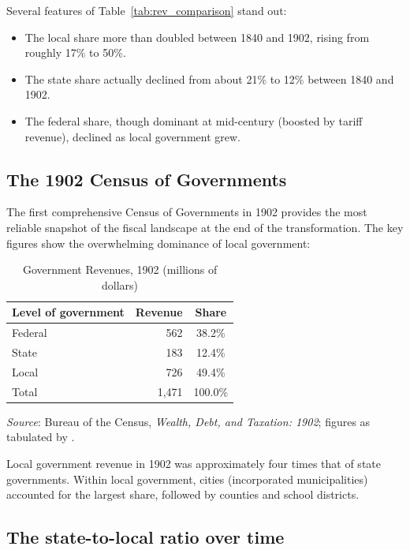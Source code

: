 \documentclass[12pt]{article}
\begin{document}
\noindent Several features of Table~\ref{tab:rev_comparison} stand out:
\begin{itemize}
    \item The local share more than doubled between 1840 and 1902, rising from roughly 17\% to 50\%.
    \item The state share actually declined from about 21\% to 12\% between 1840 and 1902.
    \item The federal share, though dominant at mid-century (boosted by tariff revenue), declined as local government grew.
\end{itemize}

\subsection{The 1902 Census of Governments}

The first comprehensive Census of Governments in 1902 provides the most reliable snapshot of the fiscal landscape at the end of the transformation.  The key figures show the overwhelming dominance of local government:

\begin{table}[htbp]
\centering
\caption{Government Revenues, 1902 (millions of dollars)}
\label{tab:1902}
\begin{tabular}{@{}lrc@{}}
\toprule
Level of government & Revenue & Share \\
\midrule
Federal & 562 & 38.2\% \\
State & 183 & 12.4\% \\
Local & 726 & 49.4\% \\
\midrule
Total & 1{,}471 & 100.0\% \\
\bottomrule
\end{tabular}
\smallskip

\small\textit{Source}: Bureau of the Census, \textit{Wealth, Debt, and Taxation: 1902}; figures as tabulated by \citet{wallis2000jep}.
\end{table}

\noindent Local government revenue in 1902 was approximately four times that of state governments.  Within local government, cities (incorporated municipalities) accounted for the largest share, followed by counties and school districts.

\subsection{The state-to-local ratio over time}
\end{document}
